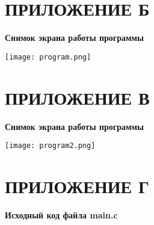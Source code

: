 \documentclass[14pt]{extarticle}
\begin{document}
{
    {
        \par
        \centering\section{ПРИЛОЖЕНИЕ Б}
        \par
    }
    \par
    {
        \par
        \centering
        \textbf{
            Снимок экрана работы программы
        }
        \par
    }
    \par

    \vspace{2em}
    \noindent
    \centering
    \texttt{[image: program.png]}

    \par
    \vfill
    \newpage
}

{
    {
        \par
        \centering\section{ПРИЛОЖЕНИЕ В}
        \par
    }
    \par
    {
        \par
        \centering
        \textbf{
            Снимок экрана работы программы
        }
        \par
    }
    \par

    \vspace{2em}
    \noindent
    \centering
    \texttt{[image: program2.png]}

    \par
    \vfill
    \newpage
}

{
    {
        \par
        \centering\section{ПРИЛОЖЕНИЕ Г}
        \par
    }
    \par
    {
        \par
        \centering
        \textbf{
            Исходный код файла main.c
        }
        \par
    }
    \par
    \vspace{1em}

    

    \par
    \vfill
    \newpage
}
\end{document}

